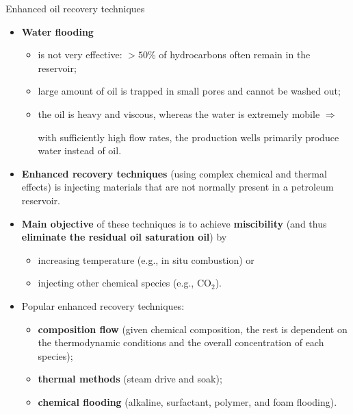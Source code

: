 %
\begin{frame}{Enhanced oil recovery techniques}
	\begin{itemize}
	 \item \alert{\bf Water flooding}
	\begin{itemize}
		\item is not very effective:  $> 50 \%$  of hydrocarbons often remain in the reservoir;
		\item large amount of oil is trapped in small pores and cannot be washed out;
		\item the oil is heavy and viscous, whereas the water is extremely mobile $\Rightarrow$
		
		with sufficiently high flow rates, the production wells primarily produce water instead of oil.
	\end{itemize}
	\item \alert{\bf Enhanced recovery techniques} (using complex chemical and thermal effects) is injecting materials that are not normally present in a petroleum reservoir. 
	\item {\bf Main objective} of these techniques	is to achieve \alert{\bf miscibility} (and thus \alert{\bf eliminate the residual oil saturation oil}) by
	\begin{itemize}
		\item increasing temperature (e.g., in situ combustion) or
		\item injecting other chemical species (e.g., CO$_2$).
	\end{itemize}
	\item Popular enhanced recovery techniques: 
		\begin{itemize}
			\item {\bf composition flow} (given chemical composition, the rest is dependent on the thermodynamic conditions and the overall concentration of each species);
			\item {\bf thermal methods} (steam drive and soak);
			\item {\bf chemical flooding} (alkaline, surfactant, polymer, and foam flooding).
		\end{itemize}
	\end{itemize}
\end{frame}
%
%
